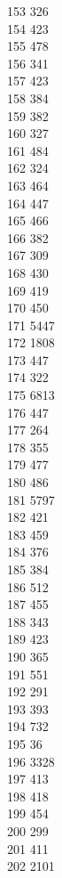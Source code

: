 { 153	326 \\
 154	423 \\
 155	478 \\
 156	341 \\
 157	423 \\
 158	384 \\
 159	382 \\
 160	327 \\
 161	484 \\
 162	324 \\
 163	464 \\
 164	447 \\
 165	466 \\
 166	382 \\
 167	309 \\
 168	430 \\
 169	419 \\
 170	450 \\
 171	5447 \\
 172	1808 \\
 173	447 \\
 174	322 \\
 175	6813 \\
 176	447 \\
 177	264 \\
 178	355 \\
 179	477 \\
 180	486 \\
 181	5797 \\
 182	421 \\
 183	459 \\
 184	376 \\
 185	384 \\
 186	512 \\
 187	455 \\
 188	343 \\
 189	423 \\
 190	365 \\
 191	551 \\
 192	291 \\
 193	393 \\
 194	732 \\
 195	36 \\
 196	3328 \\
 197	413 \\
 198	418 \\
 199	454 \\
 200	299 \\
 201	411 \\
 202	2101 \\
}

